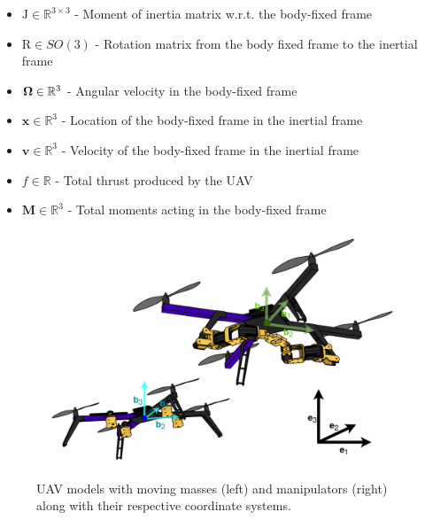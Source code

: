 \begin{itemize}
	\item $\text{J} \in \mathbb{R}^{3 \times 3}$ - Moment of inertia matrix w.r.t. the body-fixed frame
	
	\item $\text{R} \in SO(3)$ - Rotation matrix from the body fixed frame to the inertial frame
	
	\item $\boldsymbol{\Omega} \in \mathbb{R}^3$ - Angular velocity in the body-fixed frame
	
	\item $\textbf{x} \in \mathbb{R}^3$ - Location of the body-fixed frame in the inertial frame
	
	\item $\textbf{v} \in \mathbb{R}^3$ - Velocity of the body-fixed frame in the inertial frame
	
	\item $f \in \mathbb{R}$ - Total thrust produced by the UAV
	
	\item $\textbf{M} \in \mathbb{R}^3$ - Total moments acting in the body-fixed frame
\end{itemize}

\begin{figure}[h!]
	\includegraphics[width=\columnwidth]{pictures/uav.png}	
	\centering
	\label{fig:uav_model}
	\caption{UAV models with moving masses (left) and manipulators (right) along with their respective coordinate systems.}
\end{figure}


